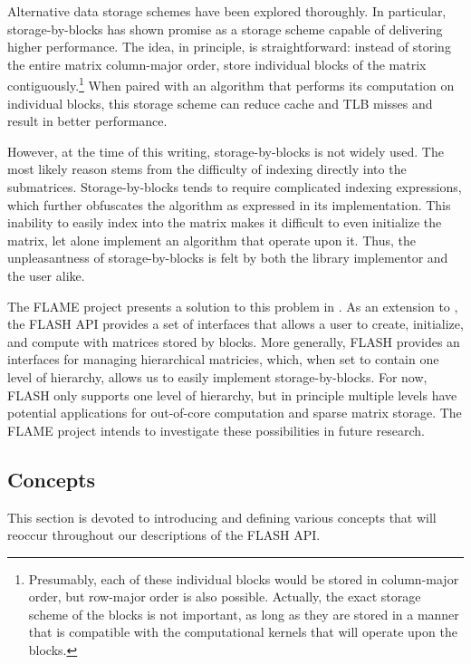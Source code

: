 Alternative data storage schemes have been explored thoroughly.
In particular, storage-by-blocks has shown promise as a storage scheme
capable of delivering higher performance.
The idea, in principle, is straightforward: instead of storing the entire
matrix column-major order, store individual blocks of the matrix
contiguously.\footnote{Presumably, each of these individual blocks would be
stored in column-major order, but row-major order is also possible.
Actually, the exact storage scheme of the blocks is not important, as long
as they are stored in a manner that is compatible with the computational
kernels that will operate upon the blocks.}
When paired with an algorithm that performs its computation on individual
blocks, this storage scheme can reduce cache and TLB misses and result in
better performance.

However, at the time of this writing, storage-by-blocks is not widely used.
The most likely reason stems from the difficulty of indexing directly into the
submatrices.
Storage-by-blocks tends to require complicated indexing expressions, which
further obfuscates the algorithm as expressed in its implementation.
This inability to easily index into the matrix makes it difficult to
even initialize the matrix, let alone implement an algorithm that operate
upon it.
Thus, the unpleasantness of storage-by-blocks is felt by both the library
implementor and the user alike.

The FLAME project presents a solution to this problem in \cite{FLASH:TR}.
As an extension to \libflamens, the FLASH API provides a set of interfaces
that allows a user to create, initialize, and compute with matrices
stored by blocks.
More generally, FLASH provides an interfaces for managing hierarchical
matricies, which, when set to contain one level of hierarchy, allows us
to easily implement storage-by-blocks.
For now, FLASH only supports one level of hierarchy, but in principle
multiple levels have potential applications for out-of-core computation
and sparse matrix storage.
The FLAME project intends to investigate these possibilities in future
research.



\subsection{Concepts}


This section is devoted to introducing and defining various concepts that will
reoccur throughout our descriptions of the FLASH API.

